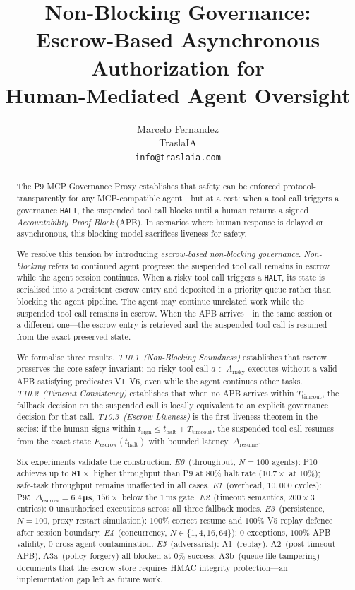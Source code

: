 \documentclass[11pt]{article}
\title{\textbf{Non-Blocking Governance:}\\[4pt]
       \large Escrow-Based Asynchronous Authorization for\\
       Human-Mediated Agent Oversight}
\author{Marcelo Fernandez\\
        \small TraslaIA\\
        \small \texttt{info@traslaia.com}}
\date{}
\newcommand{\HALT}{\texttt{HALT}}
\newcommand{\Eescrow}{E_{\mathrm{escrow}}}
\newcommand{\thalt}{t_{\mathrm{halt}}}
\newcommand{\tsign}{t_{\mathrm{sign}}}
\newcommand{\Ttimeout}{T_{\mathrm{timeout}}}
\newcommand{\Drescrow}{\Delta_{\mathrm{escrow}}}
\newcommand{\Dresume}{\Delta_{\mathrm{resume}}}
\begin{document}
\maketitle

\begin{abstract}
\noindent
The P9 MCP Governance Proxy establishes that safety can be enforced
protocol-transparently for any MCP-compatible agent---but at a cost:
when a tool call triggers a governance \HALT{}, the suspended tool call
blocks until a human returns a signed \emph{Accountability Proof Block}
(APB). In scenarios where human response is delayed or asynchronous,
this blocking model sacrifices liveness for safety.

We resolve this tension by introducing \emph{escrow-based non-blocking
governance}. \emph{Non-blocking} refers to continued agent progress: the suspended
tool call remains in escrow while the agent session continues.
When a risky tool call triggers a \HALT{}, its state is
serialised into a persistent escrow entry and deposited in a priority
queue rather than blocking the agent pipeline. The agent may continue
unrelated work while the suspended tool call remains in escrow. When the
APB arrives---in the same session or a different one---the escrow entry
is retrieved and the suspended tool call is resumed from the exact
preserved state.

We formalise three results. \emph{T10.1~(Non-Blocking Soundness)}
establishes that escrow preserves the core safety invariant: no risky
tool call $a \in A_{\mathrm{risky}}$ executes without a valid APB
satisfying predicates V1--V6, even while the agent continues other
tasks. \emph{T10.2~(Timeout Consistency)} establishes that when no
APB arrives within $\Ttimeout$, the fallback decision on the suspended
call is locally equivalent to an explicit governance decision for that
call. \emph{T10.3~(Escrow Liveness)} is the first liveness theorem in
the series: if the human signs within $\tsign \le \thalt + \Ttimeout$,
the suspended tool call resumes from the exact state
$\Eescrow(\thalt)$ with bounded latency~$\Dresume$.

Six experiments validate the construction.
\emph{E0}~(throughput, $N=100$ agents): P10 achieves up to
$\mathbf{81\times}$ higher throughput than P9 at 80\% halt rate
($10.7\times$ at 10\%); safe-task throughput remains unaffected in
all cases.
\emph{E1}~(overhead, $10{,}000$ cycles):
P95~$\Drescrow = \mathbf{6.4\,\si{\micro\second}}$, $156\times$ below
the $1\,\si{\milli\second}$ gate.
\emph{E2}~(timeout semantics, $200\times3$ entries):
$0$ unauthorised executions across all three fallback modes.
\emph{E3}~(persistence, $N=100$, proxy restart simulation):
$100\%$ correct resume and $100\%$ V5 replay defence after session
boundary.
\emph{E4}~(concurrency, $N \in \{1,4,16,64\}$): $0$ exceptions,
$100\%$ APB validity, $0$ cross-agent contamination.
\emph{E5}~(adversarial): A1~(replay), A2~(post-timeout APB),
A3a~(policy forgery) all blocked at $0\%$ success; A3b~(queue-file
tampering) documents that the escrow store requires HMAC integrity
protection---an implementation gap left as future work.
\end{abstract}
\end{document}
